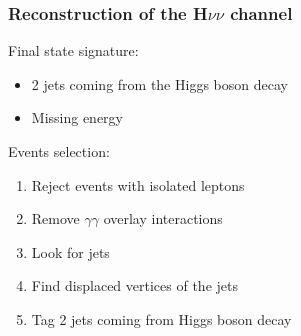 \documentclass{beamer}
\begin{document}
\begin{frame}
  \frametitle{Reconstruction of the H$\nu\nu$ channel}

  \begin{block}{Final state signature:}
    \begin{itemize}
      \item 2 jets coming from the Higgs boson decay
      \item Missing energy
    \end{itemize}
  \end{block}

  \begin{block}{Events selection:}
    \begin{enumerate}
      \item Reject events with isolated leptons
      \item Remove $\gamma\gamma$ overlay interactions 
      \item Look for jets
      \item Find displaced vertices of the jets
      \item Tag 2 jets coming from Higgs boson decay
    \end{enumerate}
  \end{block}
\end{frame}
\end{document}
